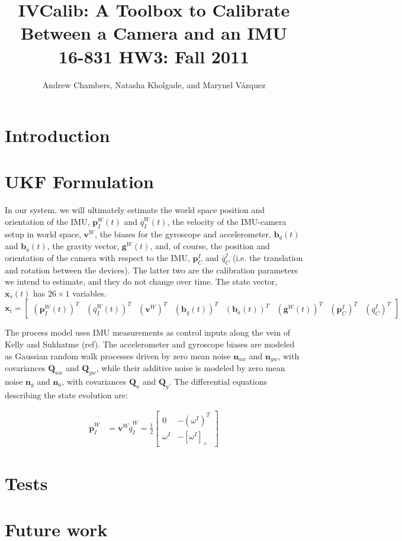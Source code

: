 \documentclass[letterpaper]{article}
\title{
  IVCalib: A Toolbox to Calibrate Between a Camera and an IMU\\
  \Large{16-831 HW3: Fall 2011}
}
\author{Andrew Chambers, Natasha Kholgade, and Marynel V\'azquez}
\date{}
\newcommand{\bb}[1]{\mathbf{#1}}
\begin{document}
\maketitle

\section{Introduction}

\section{UKF Formulation}

In our system, we will ultimately estimate the world space position and orientation of the IMU, $\bb{p}_I^W(t)$ and ${\overline{q}}_I^W(t)$, the velocity of the IMU-camera setup in world space, $\bb{v}^W$, the biases for the gyroscope and accelerometer, $\bb{b}_g(t)$ and $\bb{b}_a(t)$, the gravity vector, $\bb{g}^W(t)$, and, of course, the position and orientation of the camera with respect to the IMU, $\bb{p}_C^I$ and $\overline{q}_C^I$ (i.e. the translation and rotation between the devices). The latter two are the calibration parameters we intend to estimate, and they do not change over time. The state vector, $\bb{x}_s(t)$ has $26 \times 1$ variables.
\begin{equation}
\bb{x}_t=\begin{bmatrix} (\bb{p}_I^W(t))^T & ({\overline{q}}_I^W(t))^T  & (\bb{v}^W)^T  & (\bb{b}_g(t))^T &  (\bb{b}_a(t))^T & (\bb{g}^W(t))^T  & (\bb{p}_C^I)^T & (\overline{q}_C^I)^T\end{bmatrix}
\end{equation}

The process model uses IMU measurements as control inputs along the vein of Kelly and Sukhatme (ref). The accelerometer and gyroscope biases are modeled as Gaussian random walk processes driven by zero mean noise $\bb{n}_{aw}$ and $\bb{n}_{gw}$, with covariances $\bb{Q}_{aw}$ and $\bb{Q}_{gw}$, while their additive noise is modeled by zero mean noise $\bb{n}_g$ and $\bb{n}_a$, with covariances $\bb{Q}_a$ and $\bb{Q}_g$. The differential equations describing the state evolution are:

\begin{align}
\bb{\dot{p}}_I^W &=\bb{v}^W
\dot{\overline{q}}_I^W=\frac{1}{2}\begin{bmatrix}0 & -(\omega^I)^T \\ \omega^I & -[ \omega^I ]_{\times} \end{bmatrix}
\end{align}


\section{Tests}

\section{Future work}

\end{document}
